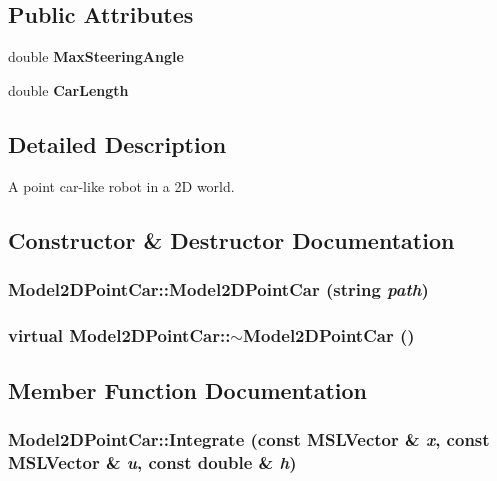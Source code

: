 \subsection*{Public Attributes}
\begin{CompactItemize}
\item 
double {\bf Max\-Steering\-Angle}
\item 
double {\bf Car\-Length}
\end{CompactItemize}


\subsection{Detailed Description}
A point car-like robot in a 2D world.



\subsection{Constructor \& Destructor Documentation}
\subsubsection{\setlength{\rightskip}{0pt plus 5cm}Model2DPoint\-Car::Model2DPoint\-Car (string {\em path})}\label{classModel2DPointCar_a0}


\subsubsection{\setlength{\rightskip}{0pt plus 5cm}virtual Model2DPoint\-Car::$\sim$Model2DPoint\-Car ()\hspace{0.3cm}{\tt  [inline, virtual]}}\label{classModel2DPointCar_a1}




\subsection{Member Function Documentation}
\subsubsection{ Model2DPoint\-Car::Integrate (const {\bf MSLVector} \& {\em x}, const {\bf MSLVector} \& {\em u}, const double \& {\em h})\hspace{0.3cm}{\tt  [virtual]}}\label{classModel2DPointCar_a2}


